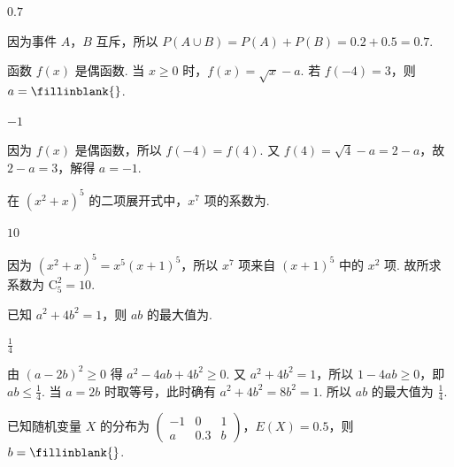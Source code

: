 \begin{answer}
\(0.7\)
\end{answer}

\begin{solution}
因为事件 \(A\)，\(B\) 互斥，所以 \( P\left( A\cup B \right)=P\left( A \right)+P\left( B \right)=0.2+0.5=0.7 \).
\end{solution}

\begin{problem}
函数 \( f(x) \) 是偶函数. 当 \( x\ge 0 \) 时，\( f(x)=\sqrt{x}-a \). 若 \( f(-4)=3 \)，则 \( a=\fillinblank{} \).
\end{problem}

\begin{answer}
\(-1\)
\end{answer}

\begin{solution}
因为 \( f(x) \) 是偶函数，所以 \( f(-4)=f(4) \). 又 \( f(4)=\sqrt{4}-a=2-a \)，故 \( 2-a=3 \)，解得 \( a=-1 \).
\end{solution}

\begin{problem}
在 \( \left( x^2+x \right)^5 \) 的二项展开式中，\( x^7 \) 项的系数为\fillinblank{}.
\end{problem}

\begin{answer}
\(10\)
\end{answer}

\begin{solution}
因为 \( \left( x^2+x \right)^5=x^5\left( x+1 \right)^5 \)，所以 \( x^7 \) 项来自 \( \left( x+1 \right)^5 \) 中的 \( x^2 \) 项. 故所求系数为 \( \mathrm C_5^2=10 \).
\end{solution}

\begin{problem}
已知 \( a^2+4b^2=1 \)，则 \( ab \) 的最大值为\fillinblank{}.
\end{problem}

\begin{answer}
\(\frac{1}{4}\)
\end{answer}

\begin{solution}
由 \( \left( a-2b \right)^2\ge 0 \) 得 \( a^2-4ab+4b^2\ge 0 \).
又 \( a^2+4b^2=1 \)，所以 \( 1-4ab\ge 0 \)，即 \( ab\le \frac{1}{4} \). 当 \( a=2b \) 时取等号，此时确有 \( a^2+4b^2=8b^2=1 \). 所以 \( ab \) 的最大值为 \( \frac{1}{4} \).
\end{solution}

\begin{problem}
已知随机变量 \(X\) 的分布为 \( \left( \begin{smallmatrix} -1 & 0 & 1 \\ a & 0.3 & b \end{smallmatrix} \right) \)，\( E\left( X \right)=0.5 \)，则 \( b=\fillinblank{} \).
\end{problem}

